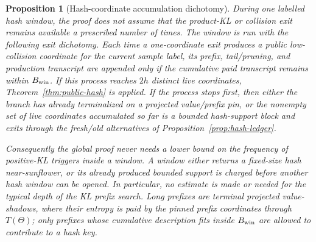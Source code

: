 \documentclass[11pt]{article}
\newtheorem{proposition}[theorem]{Proposition}
\begin{document}
\begin{proposition}[Hash-coordinate accumulation dichotomy]
\label{prop:hash-accumulation}
During one labelled hash window, the proof does not assume that the
product-KL or collision exit remains available a prescribed number of times.
The window is run with the following exit dichotomy.  Each time a
one-coordinate exit produces a public low-collision coordinate for the current
sample label, its prefix, tail/pruning, and production transcript are appended
only if the cumulative paid transcript remains within $B_{\rm win}$.  If this
process reaches $2h$ distinct live coordinates, Theorem~\ref{thm:public-hash}
is applied.  If the process stops first, then either the branch has already
terminalized on a projected value/prefix pin, or the nonempty set of live
coordinates accumulated so far is a bounded hash-support block and exits
through the fresh/old alternatives of Proposition~\ref{prop:hash-ledger}.

Consequently the global proof never needs a lower bound on the frequency of
positive-KL triggers inside a window.  A window either returns a fixed-size
hash near-sunflower, or its already produced bounded support is charged before
another hash window can be opened.  In particular, no estimate is made or
needed for the typical depth of the KL prefix search.  Long prefixes are
terminal projected value-shadows, where their entropy is paid by the pinned
prefix coordinates through $T(\Theta)$; only prefixes whose cumulative
description fits inside $B_{\rm win}$ are allowed to contribute to a hash key.
\end{proposition}
\end{document}
